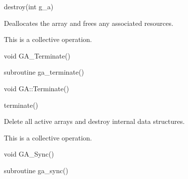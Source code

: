 \documentclass[12pt]{article}
\begin{document}
\begin{pyapi}
\begin{pycode}
destroy(int g_a)
\end{pycode}
\end{pyapi}

\begin{desc}

Deallocates the array and frees any associated resources.

This is a collective operation.

\end{desc}


\begin{capi}
\begin{ccode}
void GA_Terminate()
\end{ccode}
\end{capi}

\begin{fapi}
\begin{fcode}
subroutine ga_terminate()
\end{fcode}
\end{fapi}

\begin{cxxapi}
\begin{cxxcode}
void GA::Terminate()
\end{cxxcode}
\end{cxxapi}

\begin{pyapi}
\begin{pycode}
terminate()
\end{pycode}
\end{pyapi}

\begin{desc}

Delete all active arrays and destroy internal data structures.

This is a collective operation.

\end{desc}


\begin{capi}
\begin{ccode}
void GA_Sync()
\end{ccode}
\end{capi}

\begin{fapi}
\begin{fcode}
subroutine ga_sync()
\end{fcode}
\end{fapi}
\end{document}
